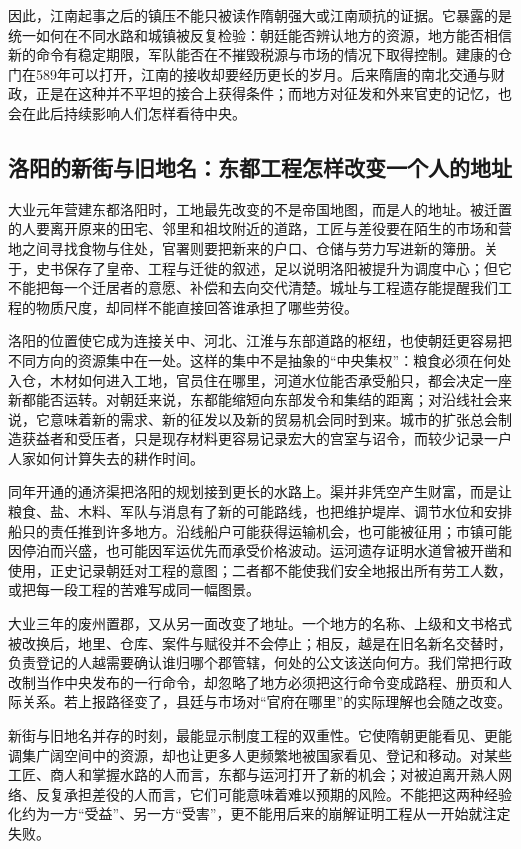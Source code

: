 因此，江南起事之后的镇压不能只被读作隋朝强大或江南顽抗的证据。它暴露的是统一如何在不同水路和城镇被反复检验：朝廷能否辨认地方的资源，地方能否相信新的命令有稳定期限，军队能否在不摧毁税源与市场的情况下取得控制。建康的仓门在589年可以打开，江南的接收却要经历更长的岁月。后来隋唐的南北交通与财政，正是在这种并不平坦的接合上获得条件；而地方对征发和外来官吏的记忆，也会在此后持续影响人们怎样看待中央。

\subsection{洛阳的新街与旧地名：东都工程怎样改变一个人的地址}
大业元年营建东都洛阳时，工地最先改变的不是帝国地图，而是人的地址。被迁置的人要离开原来的田宅、邻里和祖坟附近的道路，工匠与差役要在陌生的市场和营地之间寻找食物与住处，官署则要把新来的户口、仓储与劳力写进新的簿册。关于，史书保存了皇帝、工程与迁徙的叙述，足以说明洛阳被提升为调度中心；但它不能把每一个迁居者的意愿、补偿和去向交代清楚。城址与工程遗存能提醒我们工程的物质尺度，却同样不能直接回答谁承担了哪些劳役。

洛阳的位置使它成为连接关中、河北、江淮与东部道路的枢纽，也使朝廷更容易把不同方向的资源集中在一处。这样的集中不是抽象的“中央集权”：粮食必须在何处入仓，木材如何进入工地，官员住在哪里，河道水位能否承受船只，都会决定一座新都能否运转。对朝廷来说，东都能缩短向东部发令和集结的距离；对沿线社会来说，它意味着新的需求、新的征发以及新的贸易机会同时到来。城市的扩张总会制造获益者和受压者，只是现存材料更容易记录宏大的宫室与诏令，而较少记录一户人家如何计算失去的耕作时间。

同年开通的通济渠把洛阳的规划接到更长的水路上。渠并非凭空产生财富，而是让粮食、盐、木料、军队与消息有了新的可能路线，也把维护堤岸、调节水位和安排船只的责任推到许多地方。沿线船户可能获得运输机会，也可能被征用；市镇可能因停泊而兴盛，也可能因军运优先而承受价格波动。运河遗存证明水道曾被开凿和使用，正史记录朝廷对工程的意图；二者都不能使我们安全地报出所有劳工人数，或把每一段工程的苦难写成同一幅图景。

大业三年的废州置郡，又从另一面改变了地址。一个地方的名称、上级和文书格式被改换后，地里、仓库、案件与赋役并不会停止；相反，越是在旧名新名交替时，负责登记的人越需要确认谁归哪个郡管辖，何处的公文该送向何方。我们常把行政改制当作中央发布的一行命令，却忽略了地方必须把这行命令变成路程、册页和人际关系。若上报路径变了，县廷与市场对“官府在哪里”的实际理解也会随之改变。

新街与旧地名并存的时刻，最能显示制度工程的双重性。它使隋朝更能看见、更能调集广阔空间中的资源，却也让更多人更频繁地被国家看见、登记和移动。对某些工匠、商人和掌握水路的人而言，东都与运河打开了新的机会；对被迫离开熟人网络、反复承担差役的人而言，它们可能意味着难以预期的风险。不能把这两种经验化约为一方“受益”、另一方“受害”，更不能用后来的崩解证明工程从一开始就注定失败。

